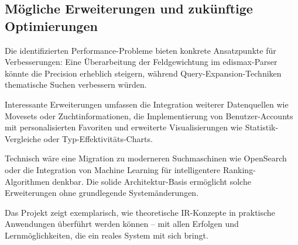 \subsection{Mögliche Erweiterungen und zukünftige Optimierungen}
\label{sec:fazit_ausblick}

Die identifizierten Performance-Probleme bieten konkrete Ansatzpunkte für Verbesserungen: Eine Überarbeitung der Feldgewichtung im edismax-Parser könnte die Precision erheblich steigern, während Query-Expansion-Techniken thematische Suchen verbessern würden.

Interessante Erweiterungen umfassen die Integration weiterer Datenquellen wie Movesets oder Zuchtinformationen, die Implementierung von Benutzer-Accounts mit personalisierten Favoriten und erweiterte Visualisierungen wie Statistik-Vergleiche oder Typ-Effektivitäts-Charts.

Technisch wäre eine Migration zu moderneren Suchmaschinen wie OpenSearch oder die Integration von Machine Learning für intelligentere Ranking-Algorithmen denkbar. Die solide Architektur-Basis ermöglicht solche Erweiterungen ohne grundlegende Systemänderungen.

Das Projekt zeigt exemplarisch, wie theoretische IR-Konzepte in praktische Anwendungen überführt werden können – mit allen Erfolgen und Lernmöglichkeiten, die ein reales System mit sich bringt.




\appendix %
